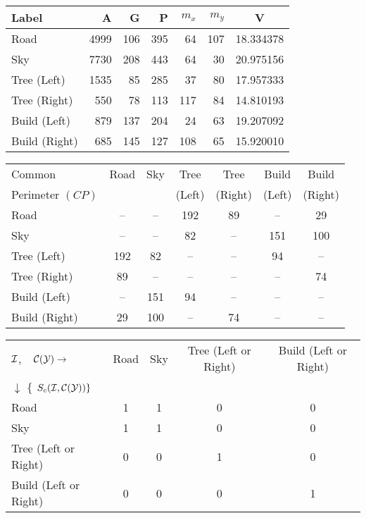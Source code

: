 {\newpage
\clearpage
\samepage \begin{table}\begin{center}
 
\begin{tabular}{||l||r|r|r|r|r|c||} \hline
Label & A & G & P & $m_x$ &$m_y$  & V \\  \hline \hline
Road   & 4999&  106&  395&  64 &107& 18.334378 \\   
Sky &7730 &208  &443  & 64&30 & 20.975156 \\ 
Tree (Left)   & 1535&   85 & 285&  37 & 80 &17.957333 \\   
Tree (Right)   &550  &  78&  113& 117 & 84& 14.810193 \\   
Build (Left)   &879  & 137 & 204 & 24 & 63& 19.207092 \\    
Build (Right) & 685 &  145&  127& 108&  65 &15.920010 \\   
\hline
\end{tabular}

\vspace{2ex}
 

\begin{tabular}{||l||c|c|c|c|c|c||} \hline
Common           & Road &Sky  & Tree & Tree & Build & Build \\ 
Perimeter  $(CP)$&     &      & (Left) &(Right) & (Left) & (Right)
\\  \hline \hline 
Road & -- & --& 192&89 &--&29 \\ 
Sky & --& -- & 82&-- &151&100\\ 
Tree (Left)  & 192&82 & -- & --&94&--\\ 
Tree (Right)  & 89&-- & -- & --&--&74\\ 
Build (Left) & --& 151& 94&-- &--&-- \\  
Build (Right) & 29&100 &-- &74 &-- &-- \\  \hline
\end{tabular}

\vspace{2ex}
 

\begin{tabular}{||l||c|c|c|c||} \hline
${\cal I}$, $\;\;\;{\cal{C(Y)}}
  \rightarrow$& Road &Sky  & Tree (Left or Right) &Build 
(Left or Right)\\  
$\downarrow$ \{ $S_c({\cal I}
 ,{\cal{C(Y)}}
 ) \}$&&&&\\  \hline \hline
Road & 1 & 1& 0& 0 \\ 
Sky & 1& 1 & 0& 0\\ 
Tree (Left or Right) & 0& 0& 1 & 0\\ 
Build (Left or Right) & 0& 0& 0& 1 \\  \hline
\end{tabular}
\end{center}
 
 \label{tab:hira_know}
\end{table}
}

